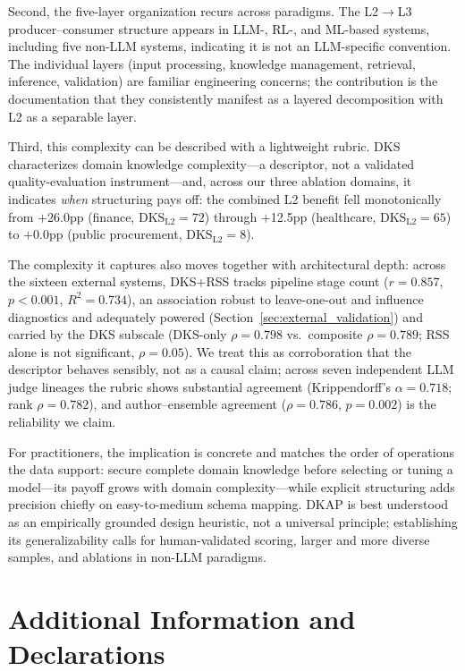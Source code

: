 \documentclass[fleqn,10pt,lineno]{wlpeerj}
\begin{document}
{\sloppy Second, the five-layer organization recurs across paradigms. The L2$\rightarrow$L3 producer--consumer structure appears in LLM-, RL-, and ML-based systems, including five non-LLM systems, indicating it is not an LLM-specific convention. The individual layers (input processing, knowledge management, retrieval, inference, validation) are familiar engineering concerns; the contribution is the documentation that they consistently manifest as a layered decomposition with L2 as a separable layer.\par}

Third, this complexity can be described with a lightweight rubric. DKS characterizes domain knowledge complexity---a descriptor, not a validated quality-evaluation instrument---and, across our three ablation domains, it indicates \textit{when} structuring pays off: the combined L2 benefit fell monotonically from $+$26.0pp (finance, $\mathrm{DKS}_{\mathrm{L2}}{=}72$) through $+$12.5pp (healthcare, $\mathrm{DKS}_{\mathrm{L2}}{=}65$) to $+$0.0pp (public procurement, $\mathrm{DKS}_{\mathrm{L2}}{=}8$).

The complexity it captures also moves together with architectural depth: across the sixteen external systems, DKS+RSS tracks pipeline stage count ($r = 0.857$, $p < 0.001$, $R^2 = 0.734$), an association robust to leave-one-out and influence diagnostics and adequately powered (Section~\ref{sec:external_validation}) and carried by the DKS subscale (DKS-only $\rho = 0.798$ vs.\ composite $\rho = 0.789$; RSS alone is not significant, $\rho = 0.05$). We treat this as corroboration that the descriptor behaves sensibly, not as a causal claim; across seven independent LLM judge lineages the rubric shows substantial agreement (Krippendorff's $\alpha = 0.718$; rank $\rho = 0.782$), and author--ensemble agreement ($\rho = 0.786$, $p = 0.002$) is the reliability we claim.

For practitioners, the implication is concrete and matches the order of operations the data support: secure complete domain knowledge before selecting or tuning a model---its payoff grows with domain complexity---while explicit structuring adds precision chiefly on easy-to-medium schema mapping. DKAP is best understood as an empirically grounded design heuristic, not a universal principle; establishing its generalizability calls for human-validated scoring, larger and more diverse samples, and ablations in non-LLM paradigms.

\section*{Additional Information and Declarations}
\end{document}
